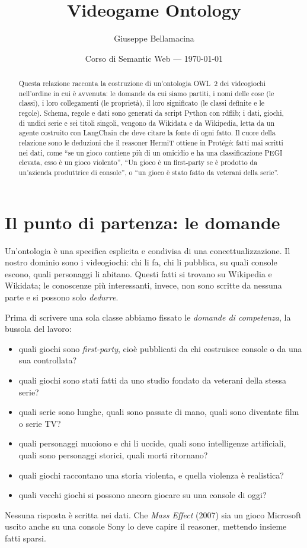\documentclass[10pt,a4paper]{article}
\title{\textbf{Videogame Ontology}\\[2pt]\large}
\author{Giuseppe Bellamacina}
\date{Corso di Semantic Web --- \today}
\begin{document}
\maketitle

\begin{abstract}
\noindent
Questa relazione racconta la costruzione di un'ontologia OWL~2 dei videogiochi nell'ordine in cui è avvenuta: le domande da cui siamo partiti, i nomi delle cose (le classi), i loro collegamenti (le proprietà), il loro significato (le classi definite e le regole). Schema, regole e dati sono generati da script Python con rdflib; i dati, \nGiochi{} giochi, di undici serie e sei titoli singoli, vengono da Wikidata e da Wikipedia, letta da un agente costruito con LangChain che deve citare la fonte di ogni fatto. Il cuore della relazione sono le deduzioni che il reasoner HermiT ottiene in Protégé: fatti mai scritti nei dati, come ``se un gioco contiene più di un omicidio e ha una classificazione PEGI elevata, esso è un gioco violento'', ``Un gioco è un first-party se è prodotto da un'azienda produttrice di console'', o ``un gioco è stato fatto da veterani della serie''.
\end{abstract}

\section{Il punto di partenza: le domande}\label{sec:domande}

Un'ontologia è una specifica esplicita e condivisa di una concettualizzazione. Il nostro dominio sono i videogiochi: chi li fa, chi li pubblica, su quali console escono, quali personaggi li abitano. Questi fatti si trovano su Wikipedia e Wikidata; le conoscenze più interessanti, invece, non sono scritte da nessuna parte e si possono solo \emph{dedurre}.

Prima di scrivere una sola classe abbiamo fissato le \emph{domande di competenza}, la bussola del lavoro:
\begin{itemize}
  \item quali giochi sono \emph{first-party}, cioè pubblicati da chi costruisce console o da una sua controllata?
  \item quali giochi sono stati fatti da uno studio fondato da veterani della stessa serie?
  \item quali serie sono lunghe, quali sono passate di mano, quali sono diventate film o serie TV?
  \item quali personaggi muoiono e chi li uccide, quali sono intelligenze artificiali, quali sono personaggi storici, quali morti ritornano?
  \item quali giochi raccontano una storia violenta, e quella violenza è realistica?
  \item quali vecchi giochi si possono ancora giocare su una console di oggi?
\end{itemize}
Nessuna risposta è scritta nei dati. Che \emph{Mass Effect} (2007) sia un gioco Microsoft uscito anche su una console Sony lo deve capire il reasoner, mettendo insieme fatti sparsi.
\end{document}
